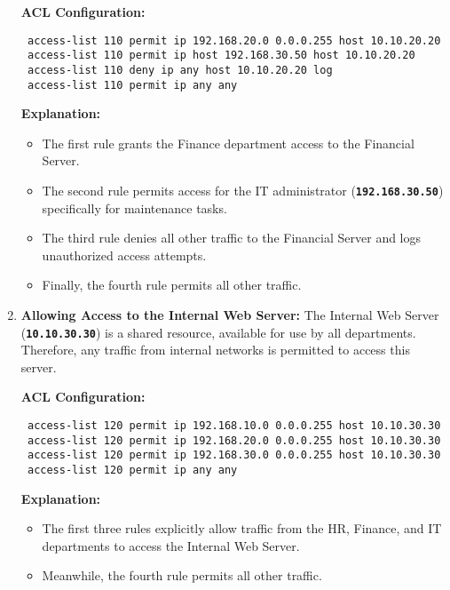 \documentclass[11pt,a4paper]{article}
\begin{document}
\begin{enumerate}
                \textbf{ACL Configuration:}
\begin{lstlisting}
 access-list 110 permit ip 192.168.20.0 0.0.0.255 host 10.10.20.20
 access-list 110 permit ip host 192.168.30.50 host 10.10.20.20
 access-list 110 deny ip any host 10.10.20.20 log
 access-list 110 permit ip any any
\end{lstlisting}
                    \textbf{Explanation:}
                        \begin{itemize}
                            \item The first rule grants the Finance department access to the Financial Server.
                            \item The second rule permits access for the IT administrator (\textbf{\lstinline{192.168.30.50}}) specifically for maintenance tasks.
                            \item The third rule denies all other traffic to the Financial Server and logs unauthorized access attempts.
                            \item Finally, the fourth rule permits all other traffic.
                        \end{itemize}

                \item \textbf{Allowing Access to the Internal Web Server:}
                \newline
                The Internal Web Server (\textbf{\lstinline{10.10.30.30}}) is a shared resource, available for use by all departments. Therefore, any traffic from internal networks is permitted to access this server.

                \textbf{ACL Configuration:}
\begin{lstlisting}
 access-list 120 permit ip 192.168.10.0 0.0.0.255 host 10.10.30.30
 access-list 120 permit ip 192.168.20.0 0.0.0.255 host 10.10.30.30
 access-list 120 permit ip 192.168.30.0 0.0.0.255 host 10.10.30.30
 access-list 120 permit ip any any
\end{lstlisting}
                \textbf{Explanation:}
                    \begin{itemize}
                        \item The first three rules explicitly allow traffic from the HR, Finance, and IT departments to access the Internal Web Server.
                        \item Meanwhile, the fourth rule permits all other traffic.
                    \end{itemize}


\end{enumerate}
\end{document}
